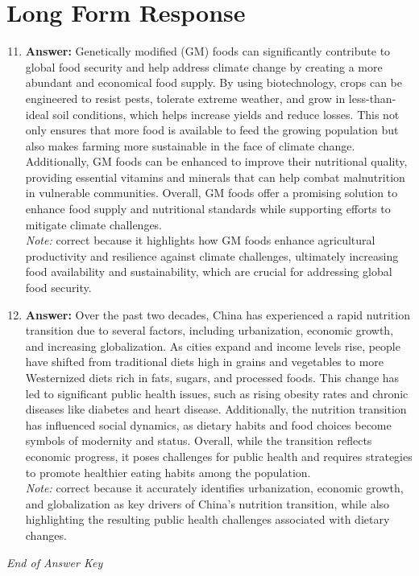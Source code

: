 \documentclass[12pt]{article}
\begin{document}
\section*{Long Form Response}
\begin{enumerate}[label=\arabic*.]
\setcounter{enumi}{10}
\item \textbf{Answer:} Genetically modified (GM) foods can significantly contribute to global food security and help address climate change by creating a more abundant and economical food supply. By using biotechnology, crops can be engineered to resist pests, tolerate extreme weather, and grow in less-than-ideal soil conditions, which helps increase yields and reduce losses. This not only ensures that more food is available to feed the growing population but also makes farming more sustainable in the face of climate change. Additionally, GM foods can be enhanced to improve their nutritional quality, providing essential vitamins and minerals that can help combat malnutrition in vulnerable communities. Overall, GM foods offer a promising solution to enhance food supply and nutritional standards while supporting efforts to mitigate climate challenges.
\\ \textit{Note:} correct because it highlights how GM foods enhance agricultural productivity and resilience against climate challenges, ultimately increasing food availability and sustainability, which are crucial for addressing global food security.
\item \textbf{Answer:} Over the past two decades, China has experienced a rapid nutrition transition due to several factors, including urbanization, economic growth, and increasing globalization. As cities expand and income levels rise, people have shifted from traditional diets high in grains and vegetables to more Westernized diets rich in fats, sugars, and processed foods. This change has led to significant public health issues, such as rising obesity rates and chronic diseases like diabetes and heart disease. Additionally, the nutrition transition has influenced social dynamics, as dietary habits and food choices become symbols of modernity and status. Overall, while the transition reflects economic progress, it poses challenges for public health and requires strategies to promote healthier eating habits among the population.
\\ \textit{Note:} correct because it accurately identifies urbanization, economic growth, and globalization as key drivers of China's nutrition transition, while also highlighting the resulting public health challenges associated with dietary changes.
\end{enumerate}

\vfill
\noindent\textit{End of Answer Key}
\end{document}

